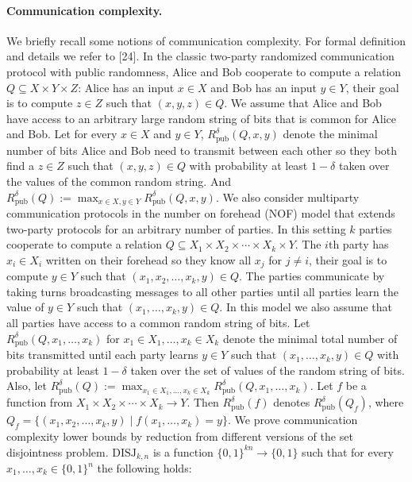 \documentclass[10pt,a4paper]{article}
\begin{document}
\paragraph{Communication complexity.} We briefly recall some notions of communication complexity. For formal definition and details we refer to [24].
In the classic two-party randomized communication protocol with public randomness, Alice and Bob cooperate to compute a relation $Q\subseteq X\times Y\times Z$: Alice has an input $x\in X$ and Bob has an input $y\in Y$, their goal is to compute $z\in Z$ such that $(x,y,z)\in Q$. We assume that Alice and Bob have access to an arbitrary large random string of bits that is common for Alice and Bob. Let for every $x\in X$ and $y\in Y$, $R^\delta_{\mathrm{pub}}(Q,x,y)$ denote the minimal number of bits Alice and Bob need to transmit between each other so they both find a $z\in Z$ such that $(x,y,z)\in Q$ with probability at least $1-\delta$ taken over the values of the common random string. And $R^\delta_{\mathrm{pub}}(Q):=\max_{x\in X,y\in Y}R^\delta_{\mathrm{pub}}(Q,x,y)$.
We also consider multiparty communication protocols in the number on forehead (NOF) model that extends two-party protocols for an arbitrary number of parties. In this setting $k$ parties cooperate to compute a relation $Q\subseteq X_1\times X_2\times\cdots\times X_k\times Y$. The $i$th party has $x_i\in X_i$ written on their forehead so they know all $x_j$ for $j\ne i$, their goal is to compute $y\in Y$ such that $(x_1,x_2,\ldots,x_k,y)\in Q$. The parties communicate by taking turns broadcasting messages to all other parties until all parties learn the value of $y\in Y$ such that $(x_1,\ldots,x_k,y)\in Q$. In this model we also assume that all parties have access to a common random string of bits. Let $R^\delta_{\mathrm{pub}}(Q,x_1,\ldots,x_k)$ for $x_1\in X_1,\ldots,x_k\in X_k$ denote the minimal total number of bits transmitted until each party learns $y\in Y$ such that $(x_1,\ldots,x_k,y)\in Q$ with probability at least $1-\delta$ taken over the set of values of the random string of bits. Also, let $R^\delta_{\mathrm{pub}}(Q):=\max_{x_1\in X_1,\ldots,x_k\in X_k}R^\delta_{\mathrm{pub}}(Q,x_1,\ldots,x_k)$.
Let $f$ be a function from $X_1\times X_2\times\cdots\times X_k\to Y$. Then $R^\delta_{\mathrm{pub}}(f)$ denotes $R^\delta_{\mathrm{pub}}(Q_f)$, where $Q_f=\{(x_1,x_2,\ldots,x_k,y)\mid f(x_1,\ldots,x_k)=y\}$.
We prove communication complexity lower bounds by reduction from different versions of the set disjointness problem. $\mathrm{DISJ}_{k,n}$ is a function $\{0,1\}^{kn}\to\{0,1\}$ such that for every $x_1,\ldots,x_k\in\{0,1\}^n$ the following holds:
\end{document}

